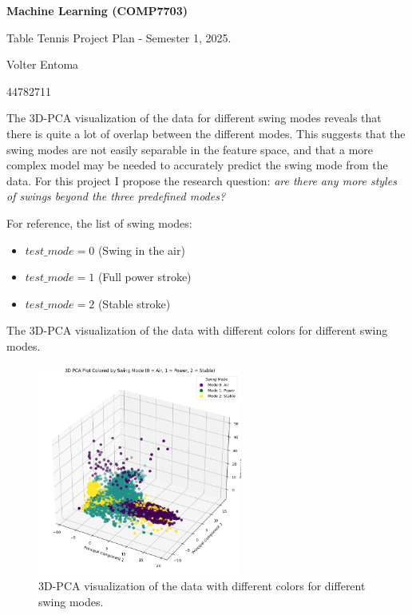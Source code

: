 \documentclass[12pt]{article}
\begin{document}
\begin{center}

{\Large  {\bf Machine Learning (COMP7703)}

Table Tennis Project Plan - Semester 1, 2025.

\vspace{10pt}

{\large Volter Entoma}

{\large 44782711}
}
\end{center}

The 3D-PCA visualization of the data for different swing modes reveals that there is quite a lot of overlap between the different modes.
This suggests that the swing modes are not easily separable in the feature space, and that a more complex model may be needed to accurately predict the swing mode from the data.
For this project I propose the research question: \textit{are there any more styles of swings beyond the three predefined modes?}

For reference, the list of swing modes:

\begin{itemize}
    \item $test\_mode = 0$ (Swing in the air)
    \item $test\_mode = 1$ (Full power stroke)
    \item $test\_mode = 2$ (Stable stroke)
\end{itemize}

The 3D-PCA visualization of the data with different colors for different swing modes.
\begin{figure}[h!]
    \centering
    \includegraphics[width=0.6\textwidth]{3d_pca_swing_modes.png}
    \caption{3D-PCA visualization of the data with different colors for different swing modes.}
    \label{fig:3d_pca}
\end{figure}
\end{document}

